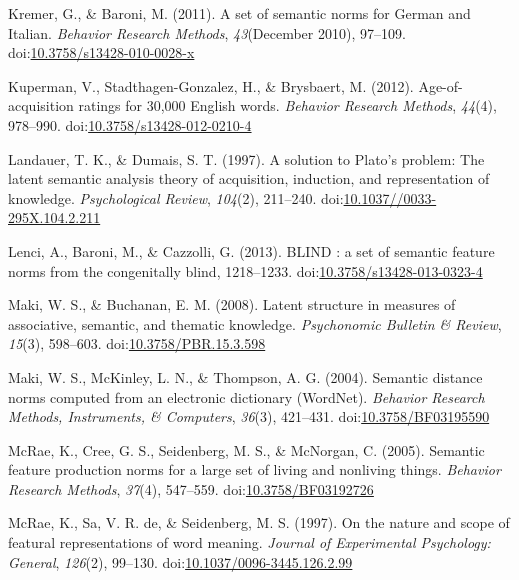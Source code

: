 \documentclass[english,man]{apa6}
\theoremstyle{definition}
\theoremstyle{definition}
\theoremstyle{definition}
\theoremstyle{remark}
\begin{document}
\hypertarget{ref-Kremer2011a}{}
Kremer, G., \& Baroni, M. (2011). A set of semantic norms for German and
Italian. \emph{Behavior Research Methods}, \emph{43}(December 2010),
97--109.
doi:\href{https://doi.org/10.3758/s13428-010-0028-x}{10.3758/s13428-010-0028-x}

\hypertarget{ref-Kuperman2012}{}
Kuperman, V., Stadthagen-Gonzalez, H., \& Brysbaert, M. (2012).
Age-of-acquisition ratings for 30,000 English words. \emph{Behavior
Research Methods}, \emph{44}(4), 978--990.
doi:\href{https://doi.org/10.3758/s13428-012-0210-4}{10.3758/s13428-012-0210-4}

\hypertarget{ref-Landauer1997}{}
Landauer, T. K., \& Dumais, S. T. (1997). A solution to Plato's problem:
The latent semantic analysis theory of acquisition, induction, and
representation of knowledge. \emph{Psychological Review}, \emph{104}(2),
211--240.
doi:\href{https://doi.org/10.1037//0033-295X.104.2.211}{10.1037//0033-295X.104.2.211}

\hypertarget{ref-Lenci2013}{}
Lenci, A., Baroni, M., \& Cazzolli, G. (2013). BLIND : a set of semantic
feature norms from the congenitally blind, 1218--1233.
doi:\href{https://doi.org/10.3758/s13428-013-0323-4}{10.3758/s13428-013-0323-4}

\hypertarget{ref-Maki2008}{}
Maki, W. S., \& Buchanan, E. M. (2008). Latent structure in measures of
associative, semantic, and thematic knowledge. \emph{Psychonomic
Bulletin \& Review}, \emph{15}(3), 598--603.
doi:\href{https://doi.org/10.3758/PBR.15.3.598}{10.3758/PBR.15.3.598}

\hypertarget{ref-Maki2004}{}
Maki, W. S., McKinley, L. N., \& Thompson, A. G. (2004). Semantic
distance norms computed from an electronic dictionary (WordNet).
\emph{Behavior Research Methods, Instruments, \& Computers},
\emph{36}(3), 421--431.
doi:\href{https://doi.org/10.3758/BF03195590}{10.3758/BF03195590}

\hypertarget{ref-McRae2005}{}
McRae, K., Cree, G. S., Seidenberg, M. S., \& McNorgan, C. (2005).
Semantic feature production norms for a large set of living and
nonliving things. \emph{Behavior Research Methods}, \emph{37}(4),
547--559.
doi:\href{https://doi.org/10.3758/BF03192726}{10.3758/BF03192726}

\hypertarget{ref-McRae1997}{}
McRae, K., Sa, V. R. de, \& Seidenberg, M. S. (1997). On the nature and
scope of featural representations of word meaning. \emph{Journal of
Experimental Psychology: General}, \emph{126}(2), 99--130.
doi:\href{https://doi.org/10.1037/0096-3445.126.2.99}{10.1037/0096-3445.126.2.99}
\end{document}
